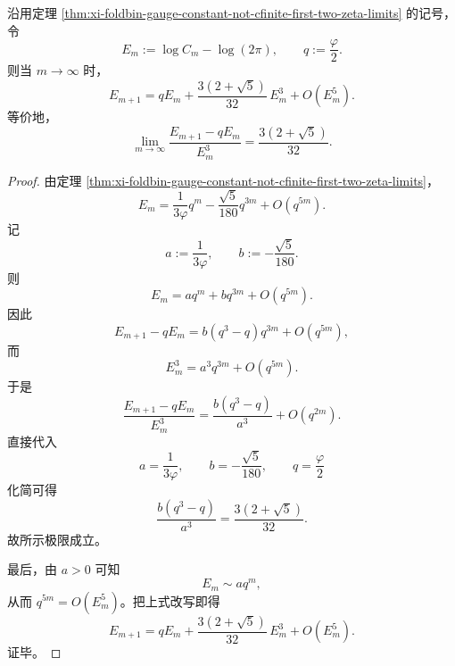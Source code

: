 \begin{theorem}\label{thm:xi-fold-gauge-defect-cubic-renormalization-normal-form}
沿用定理 \ref{thm:xi-foldbin-gauge-constant-not-cfinite-first-two-zeta-limits} 的记号，令
\[
E_m:=\log C_m-\log(2\pi),
\qquad
q:=\frac{\varphi}{2}.
\]
则当 \(m\to\infty\) 时，
\[
\boxed{\;
E_{m+1}
=
qE_m+\frac{3(2+\sqrt5)}{32}\,E_m^3+O(E_m^5).\;}
\]
等价地，
\[
\boxed{\;
\lim_{m\to\infty}
\frac{E_{m+1}-qE_m}{E_m^3}
=
\frac{3(2+\sqrt5)}{32}.\;}
\]
\end{theorem}
\begin{proof}
由定理 \ref{thm:xi-foldbin-gauge-constant-not-cfinite-first-two-zeta-limits}，
\[
E_m
=
\frac{1}{3\varphi}q^m-\frac{\sqrt5}{180}q^{3m}+O(q^{5m}).
\]
记
\[
a:=\frac{1}{3\varphi},
\qquad
b:=-\frac{\sqrt5}{180}.
\]
则
\[
E_m=aq^m+bq^{3m}+O(q^{5m}).
\]
因此
\[
E_{m+1}-qE_m
=
b(q^3-q)q^{3m}+O(q^{5m}),
\]
而
\[
E_m^3
=
a^3 q^{3m}+O(q^{5m}).
\]
于是
\[
\frac{E_{m+1}-qE_m}{E_m^3}
=
\frac{b(q^3-q)}{a^3}+O(q^{2m}).
\]
直接代入
\[
a=\frac{1}{3\varphi},
\qquad
b=-\frac{\sqrt5}{180},
\qquad
q=\frac{\varphi}{2}
\]
化简可得
\[
\frac{b(q^3-q)}{a^3}
=
\frac{3(2+\sqrt5)}{32}.
\]
故所示极限成立。

最后，由 \(a>0\) 可知
\[
E_m\sim aq^m,
\]
从而 \(q^{5m}=O(E_m^5)\)。把上式改写即得
\[
E_{m+1}
=
qE_m+\frac{3(2+\sqrt5)}{32}\,E_m^3+O(E_m^5).
\]
证毕。
\end{proof}

\endinput
